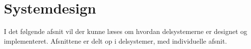 \chapter{Systemdesign}
I det følgende afsnit vil der kunne læses om hvordan delsystemerne er designet og implementeret. Afsnittene er delt op i delsystemer, med individuelle afsnit.


\newpage

\newpage

\newpage
